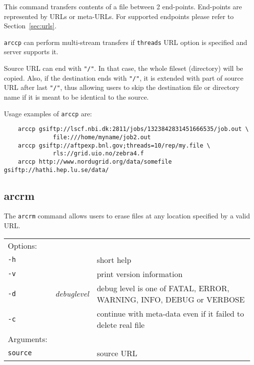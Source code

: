 This command transfers contents of a file between 2 end-points.
End-points are represented by URLs or meta-URLs. For supported
endpoints please refer to Section~\ref{sec:urls}.

\texttt{arccp} can perform multi-stream transfers if \texttt{threads}
URL option is specified and server supports it.

Source URL can end with \verb#"/"#. In that case, the whole fileset
(directory) will be copied. Also, if the destination ends with
\verb#"/"#, it is extended with part of source URL after last
\verb#"/"#, thus allowing users to skip the destination file or
directory name if it is meant to be identical to the source.

Usage examples of \texttt{arccp} are:

\begin{verbatim}
    arccp gsiftp://lscf.nbi.dk:2811/jobs/1323842831451666535/job.out \
              file:///home/myname/job2.out
    arccp gsiftp://aftpexp.bnl.gov;threads=10/rep/my.file \
              rls://grid.uio.no/zebra4.f
    arccp http://www.nordugrid.org/data/somefile gsiftp://hathi.hep.lu.se/data/
\end{verbatim}

\subsection{arcrm}\label{sec:arcrm}

The \texttt{arcrm}
command allows users to erase files at any location specified by a
valid URL.
\hspace*{0.5cm}
\begin{shaded}
\end{shaded}
\begin{longtable}{llp{8cm}}
    Options:&&\\
    \texttt{-h} && short help\\
    \texttt{-v} && print version information\\
    \texttt{-d} & \textit{debuglevel} &debug level is one of  FATAL, ERROR, WARNING, INFO, DEBUG or VERBOSE\\
    \texttt{-c} & &continue with meta-data even if it failed to delete real file\\
    Arguments:&&\\
    \texttt{source} && source URL\\
\end{longtable}

